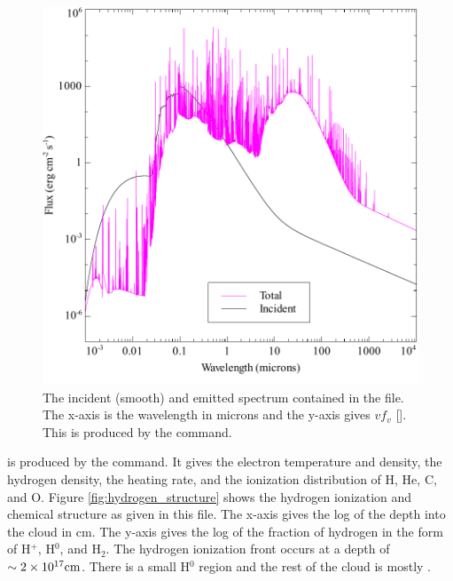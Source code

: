 \documentclass[12pt,twoside]{article}
\begin{document}
{\begin{figure}
\begin{center}
\includegraphics[clip=on,width=0.8\columnwidth,height=0.8\textheight,keepaspectratio]{orion_hii_pdr_pp_con}
\end{center}
\caption{The incident (smooth) and emitted spectrum contained in the
 file.  The
x-axis is the wavelength in microns and
the y-axis gives $vf_v$ [\ergpscmps ].  This is produced by the
 command.}
\label{fig:orion_hii_pdr_pp_con}
\end{figure}

 is produced
by the  command.  It gives
the electron temperature and density, the hydrogen density, the heating
rate, and the ionization distribution of H, He, C, and O.
Figure \ref{fig:hydrogen_structure} shows the hydrogen ionization
and chemical structure as given in this file.
The x-axis gives the log of the depth into the cloud in cm.
The y-axis gives the log of the fraction of hydrogen in the form of H$^+$,
H$^0$, and H$_2$.
The hydrogen ionization
front occurs at a depth of $\sim 2 \times 10^{17} \rm{cm}$.
There is a small H$^0$ region and the rest of the cloud is mostly \htwo .

}
\end{document}
